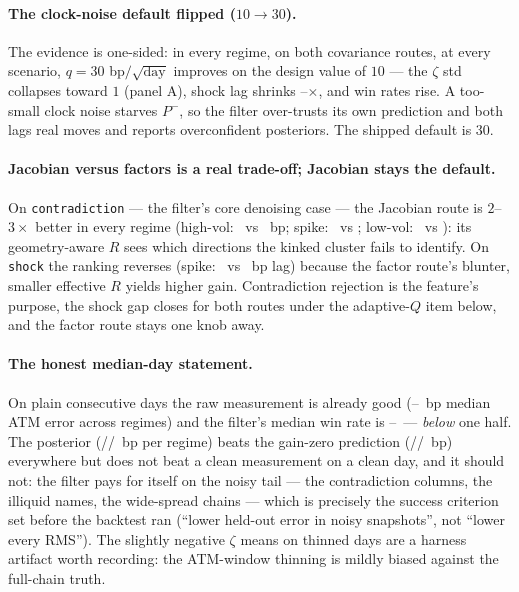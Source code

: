 \documentclass[11pt]{article}
\begin{document}
\paragraph{The clock-noise default flipped ($10\to30$).} The evidence is
one-sided: in every regime, on both covariance routes, at every scenario,
$q=30$ bp$/\sqrt{\text{day}}$ improves on the design value of $10$ --- the
$\zeta$ std collapses toward $1$ (panel A), shock lag shrinks
\KalShockImproveMin--\KalShockImproveMax$\times$, and win rates rise. A
too-small clock noise starves $P^-$, so the filter over-trusts its own
prediction and both lags real moves and reports overconfident posteriors. The
shipped default is $30$.

\paragraph{Jacobian versus factors is a real trade-off; Jacobian stays the
default.} On \texttt{contradiction} --- the filter's core denoising case ---
the Jacobian route is $2$--$3\times$ better in every regime
(high-vol: \KalContraJacHigh\ vs \KalContraFacHigh\ bp; spike:
\KalContraJacSpike\ vs \KalContraFacSpike; low-vol: \KalContraJacLow\ vs
\KalContraFacLow): its geometry-aware $R$ sees which directions the kinked
cluster fails to identify. On \texttt{shock} the ranking reverses (spike:
\KalShockJacSpike\ vs \KalShockFacSpike\ bp lag) because the factor route's
blunter, smaller effective $R$ yields higher gain. Contradiction rejection is
the feature's purpose, the shock gap closes for both routes under the
adaptive-$Q$ item below, and the factor route stays one knob away.

\paragraph{The honest median-day statement.} On plain consecutive days the raw
measurement is already good (\KalErrMeasLow--\KalErrMeasHigh\ bp median ATM
error across regimes) and the filter's median win rate is
\KalWinSpike--\KalWinHigh\ --- \emph{below} one half. The posterior
(\KalErrPostSpike/\KalErrPostHigh/\KalErrPostLow\ bp per regime) beats the
gain-zero prediction (\KalErrPredSpike/\KalErrPredHigh/\KalErrPredLow\ bp)
everywhere but does not beat a clean measurement on a clean day, and it should
not: the filter pays for itself on the noisy tail --- the contradiction
columns, the illiquid names, the wide-spread chains --- which is precisely the
success criterion set before the backtest ran (``lower held-out error in noisy
snapshots'', not ``lower every RMS''). The slightly negative $\zeta$ means on
thinned days are a harness artifact worth recording: the ATM-window thinning
is mildly biased against the full-chain truth.
\end{document}
